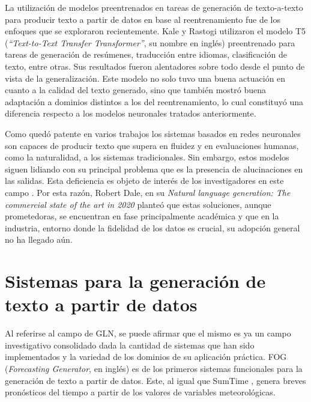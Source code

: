     La utilización de modelos preentrenados en tareas de generación de texto-a-texto para producir texto a partir de datos en base al reentrenamiento 
fue de los enfoques que se exploraron recientemente. Kale y Rastogi  utilizaron el modelo T5 (\emph{“Text-to-Text Transfer Transformer”}, su nombre en inglés) 
preentrenado para tareas de generación de resúmenes, traducción entre idiomas, clasificación de texto, entre otras. Sus resultados fueron alentadores sobre todo desde el punto de vista de 
la generalización. Este modelo no solo tuvo una buena actuación en cuanto a la calidad del texto generado, sino que también mostró buena adaptación a dominios distintos a los 
del reentrenamiento, lo cual constituyó una diferencia respecto a los modelos neuronales tratados anteriormente.


    Como quedó patente en varios trabajos  los sistemas basados en redes neuronales
son capaces de producir texto que supera en fluidez y en evaluaciones humanas, como la naturalidad, a los sistemas tradicionales. Sin embargo, estos modelos siguen lidiando con su principal
problema que es la presencia de alucinaciones en las salidas. Esta deficiencia es objeto de interés de los investigadores en este campo . Por esta razón, Robert Dale, 
en su \textit{Natural language generation: The commercial state of the art in 2020}  planteó que estas soluciones, aunque prometedoras, se 
encuentran en fase principalmente académica y que en la industria, entorno donde la fidelidad de los datos es crucial, su adopción general no ha llegado aún.   


\section{Sistemas para la generación de texto a partir de datos}

    Al referirse al campo de GLN, se puede afirmar que el mismo es ya un campo investigativo consolidado dada la cantidad 
de sistemas que han sido implementados y la variedad de los dominios de su aplicación práctica. FOG (\emph{Forecasting Generator}, en inglés)  es 
de los primeros sistemas funcionales para la generación de texto a partir de datos. Este, al igual que SumTime , genera breves pronósticos del tiempo
a partir de los valores de variables meteorológicas. 


